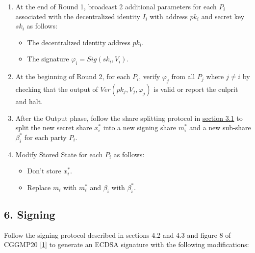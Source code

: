 \documentclass[
]{article}
\providecommand{\tightlist}{%
  \setlength{\itemsep}{0pt}\setlength{\parskip}{0pt}}
\begin{document}
\begin{enumerate}
\def\labelenumi{\arabic{enumi}.}
\tightlist
\item
  At the end of Round 1, broadcast 2 additional parameters for each
  \(P_i\) associated with the decentralized identity \(I_i\) with
  address \(pk_i\) and secret key \(sk_i\) as follows:

  \begin{itemize}
  \tightlist
  \item
    The decentralized identity address \(pk_i\).
  \item
    The signature \(\varphi _i = Sig(sk_i, V_i)\).
  \end{itemize}
\item
  At the beginning of Round 2, for each \(P_i\), verify \(\varphi _j\)
  from all \(P_j\) where \(j \neq i\) by checking that the output of
  \(Ver(pk_j, V_j, \varphi _j)\) is valid or report the culprit and
  halt.
\item
  After the Output phase, follow the share splitting protocol in
  \protect\hyperlink{share-splitting}{section 3.1} to split the new
  secret share \(x_i^\ast\) into a new signing share \(m_i^\ast\) and a
  new sub-share \(\beta _i^\ast\) for each party \(P_i\).
\item
  Modify Stored State for each \(P_i\) as follows:

  \begin{itemize}
  \tightlist
  \item
    Don't store \(x_i^\ast\).
  \item
    Replace \(m_i\) with \(m_i^\ast\) and \(\beta _i\) with
    \(\beta _i^\ast\).
  \end{itemize}
\end{enumerate}

\hypertarget{signing}{%
\subsection{6. Signing}\label{signing}}

Follow the signing protocol described in sections 4.2 and 4.3 and figure
8 of CGGMP20 {[}\protect\hyperlink{ref-cggmp20}{1}{]} to generate an
ECDSA signature with the following modifications:
\end{document}
